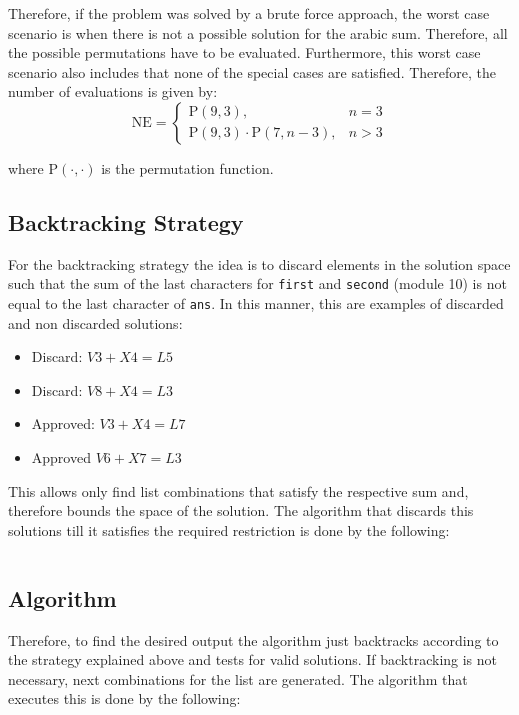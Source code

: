 \documentclass[11pt]{article}
\theoremstyle{definition}
\theoremstyle{remark}
\theoremstyle{remark}
\newcommand{\code}[2]{\inputminted[frame=lines, linenos, firstline=#1,
  lastline=#2]{cpp}{../src/roman-numerals.cpp}}
\begin{document}
Therefore, if the problem was solved by a brute force approach, the worst case
scenario is when there is not a possible solution for the arabic sum. Therefore,
all the possible permutations have to be evaluated. Furthermore, this worst case
scenario also includes that none of the special cases are satisfied. Therefore,
the number of evaluations is given by:
%
\begin{equation*}
  \mathrm{NE} =
  \begin{cases}
    \mathrm{P}(9, 3), &n = 3 \\
    \mathrm{P}(9, 3) \cdot \mathrm{P}(7, n - 3), &n > 3
  \end{cases}
\end{equation*}

where $\mathrm{P}(\cdot, \cdot)$ is the permutation function.

\subsection{Backtracking Strategy}
For the backtracking strategy the idea is to discard elements in the solution
space such that the sum of the last characters for \texttt{first} and
\texttt{second} (module 10) is not equal to the last character of \texttt{ans}.
In this manner, this are examples of discarded and non discarded solutions:
%
\begin{itemize}
  \item Discard: $V3 + X4 = L5$
  \item Discard: $V8 + X4 = L3$
  \item Approved: $V3 + X4 = L7$
  \item Approved $V6 + X7 = L3$
\end{itemize}
%
This allows only find list combinations that satisfy the respective sum and,
therefore bounds the space of the solution. The algorithm that discards this
solutions till it satisfies the required restriction is done by the following:
\code{315}{338}

\subsection{Algorithm}
Therefore, to find the desired output the algorithm just backtracks according to
the strategy explained above and tests for valid solutions. If backtracking is
not necessary, next combinations for the list are generated. The algorithm that
executes this is done by the following: \code{342}{362}
\end{document}
